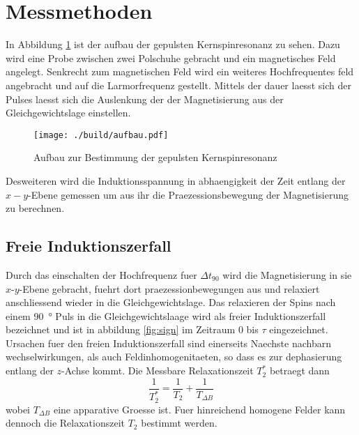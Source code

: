 \section{Messmethoden}%
\label{sec:messmethoden}
In Abbildung \ref{fig:aufbau} ist der aufbau der gepulsten Kernspinresonanz zu
sehen. 
Dazu wird eine Probe zwischen zwei Polschuhe gebracht und ein magnetisches Feld
angelegt.
Senkrecht zum magnetischen Feld wird ein weiteres Hochfrequentes feld angebracht
und auf die Larmorfrequenz gestellt. 
Mittels der dauer laesst sich der Pulses laesst sich die Auslenkung der
der Magnetisierung aus der Gleichgewichtslage einstellen. 
\begin{figure}[ht]
		\centering
		\texttt{[image: ./build/aufbau.pdf]}
		\caption{Aufbau zur Bestimmung der gepulsten Kernspinresonanz}
		\label{fig:aufbau}
\end{figure}
Desweiteren wird die Induktionsspannung in abhaengigkeit der Zeit entlang der $x-y$-Ebene gemessen um aus
ihr die Praezessionsbewegung der Magnetisierung zu berechnen.

\subsection{Freie Induktionszerfall}%
\label{sub:freie_induktionszerfall}
Durch das einschalten der Hochfrequenz fuer $\Delta t_{90}$ wird die
Magnetisierung in sie $x$-$y$-Ebene gebracht, fuehrt dort praezessionbewegungen aus und relaxiert anschliessend wieder in
die Gleichgewichtslage. 
Das relaxieren der Spins nach einem \SI{90}{\degree} Puls in die
Gleichgewichtslaage wird als freier Induktionszerfall bezeichnet und ist in
abbildung \ref{fig:sign} im Zeitraum 0 bis $\tau$ eingezeichnet.
Ursachen fuer den freien Induktionszerfall sind einerseits Naechste nachbarn
wechselwirkungen, als auch Feldinhomogenitaeten, so dass es zur dephasierung
entlang der $z$-Achse kommt.
Die Messbare Relaxationszeit $T_2^*$ betraegt dann
\begin{equation}
		\frac{1}{T_2^*} = \frac{1}{T_2} + \frac{1}{T_{\Delta B}}
\end{equation}
wobei $T_{\Delta B}$ eine apparative Groesse ist. 
Fuer hinreichend homogene Felder kann dennoch die Relaxationszeit $T_2$ 
bestimmt werden. 
